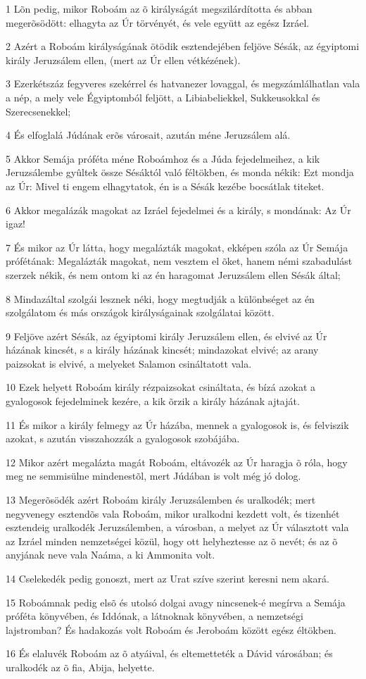 \par 1 Lõn pedig, mikor Roboám az õ királyságát megszilárdította és abban megerõsödött: elhagyta az Úr törvényét, és vele együtt az egész Izráel.
\par 2 Azért a Roboám királyságának ötödik esztendejében feljöve Sésák, az égyiptomi király Jeruzsálem ellen, (mert az Úr ellen vétkézének).
\par 3 Ezerkétszáz fegyveres szekérrel és hatvanezer lovaggal, és megszámlálhatlan vala a nép, a mely vele Égyiptomból feljött, a Libiabeliekkel, Sukkeusokkal és Szerecsenekkel;
\par 4 És elfoglalá Júdának erõs városait, azután méne Jeruzsálem alá.
\par 5 Akkor Semája próféta méne Roboámhoz és a Júda fejedelmeihez, a kik Jeruzsálembe gyûltek össze Sésáktól való féltökben, és monda nékik: Ezt mondja az Úr: Mivel ti engem elhagytatok, én is a Sésák kezébe bocsátlak titeket.
\par 6 Akkor megalázák magokat az Izráel fejedelmei és a király, s mondának: Az Úr igaz!
\par 7 És mikor az Úr látta, hogy megalázták magokat, ekképen szóla az Úr Semája prófétának: Megalázták magokat, nem vesztem el õket, hanem némi szabadulást szerzek nékik, és nem ontom ki az én haragomat Jeruzsálem ellen Sésák által;
\par 8 Mindazáltal szolgái lesznek néki, hogy megtudják a különbséget az én szolgálatom és más országok királyságainak szolgálatai között.
\par 9 Feljöve azért Sésák, az égyiptomi király Jeruzsálem ellen, és elvivé az Úr házának kincsét, s a király házának kincsét; mindazokat elvivé; az arany paizsokat is elvivé, a melyeket Salamon csináltatott vala.
\par 10 Ezek helyett Roboám király rézpaizsokat csináltata, és bízá azokat a gyalogosok fejedelminek kezére, a kik õrzik a király házának ajtaját.
\par 11 És mikor a király felmegy az Úr házába, mennek a gyalogosok is, és felviszik azokat, s azután visszahozzák a gyalogosok szobájába.
\par 12 Mikor azért megalázta magát Roboám, eltávozék az Úr haragja õ róla, hogy meg ne semmisülne mindenestõl, mert Júdában is volt még jó dolog.
\par 13 Megerõsödék azért Roboám király Jeruzsálemben és uralkodék; mert negyvenegy esztendõs vala Roboám, mikor uralkodni kezdett volt, és tizenhét esztendeig uralkodék Jeruzsálemben, a városban, a melyet az Úr választott vala az Izráel minden nemzetségei közül, hogy ott helyheztesse az õ nevét; és az õ anyjának neve vala Naáma, a ki Ammonita volt.
\par 14 Cselekedék pedig gonoszt, mert az Urat szíve szerint keresni nem akará.
\par 15 Roboámnak pedig elsõ és utolsó dolgai avagy nincsenek-é megírva a Semája próféta könyvében, és Iddónak, a látnoknak  könyvében, a nemzetségi lajstromban? És hadakozás volt Roboám és Jeroboám között egész éltökben.
\par 16 És elaluvék Roboám az õ atyáival, és eltemetteték a Dávid városában; és uralkodék az õ fia,  Abija, helyette.

